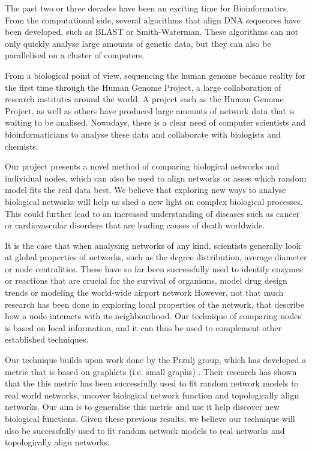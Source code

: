 The past two or three decades have been an exciting time for Bioinformatics.
From the computational side, several algorithms that align DNA sequences have
been developed, such as BLAST\cite{altschul1990basic} or
Smith-Waterman\cite{smith1981identification}. These algorithms can not
only quickly analyse large amounts of genetic data, but they can also be
parallelised on a cluster of computers. 

From a biological point of view, sequencing the human genome became reality for
the
first time through the Human Genome Project\cite{watson1990human}, a large
collaboration of research
institutes around the world. A project such as the Human Genome Project, as
well as others have produced large amounts of network data that is waiting to
be analised. Nowadays, there is a clear need of computer scientists and
bioinformaticians to analyse these data and collaborate with biologists and
chemists. 

Our project presents a novel method of comparing biological networks and
individual nodes, which can also be used to align networks or asses which
random model fits the real data best. We believe that exploring new ways to
analyse biological networks will help us shed a new light on complex biological
processes. This could further lead to an increased understanding of diseases
such as cancer or cardiovascular disorders that are leading causes of death
worldwide\cite{jemal2008cancer}\cite{world2004annex}. 

It is the case that when analysing networks of any kind, scientists generally
look at global properties of networks, such as the degree distribution,
average diameter or node centralities. These have so far been
successfully used to identify enzymes or reactions that are crucial for
the survival of organisms\cite{rahman2006observing}, model drug design
trends\cite{yildirim2007drug} or modeling the world-wide airport
network\cite{guimera2004modeling} However, not that much research has been
done in exploring local properties of the network, that describe how a node
interacts with its neighbourhood. Our technique of comparing nodes is based on
local information, and it can thus be used to complement other established
techniques.

Our technique builds upon work done by the Przulj group, which has developed a
metric that is based on graphlets (i.e. small
graphs) \cite{prvzulj2007biological}. Their research has shown that the
this metric has been successfully used to fit random network models to real
world networks\cite{prvzulj2004modeling}, uncover biological network
function\cite{milenkoviae2008uncovering} and topologically align
networks\cite{kuchaiev2010topological}. Our aim is to generalise this metric
and use it help discover new biological functions. Given these previous results,
we believe our technique will also be successfully used to fit
random network models to real networks and topologically align networks.

